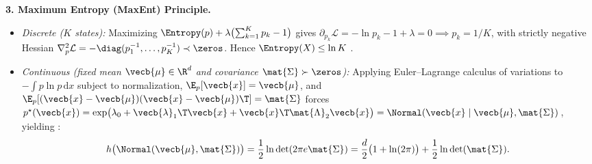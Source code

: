 \documentclass[../../../../master.tex]{subfiles}
\begin{document}
\begin{coremath}
\textbf{3. Maximum Entropy (MaxEnt) Principle.}
\begin{itemize}[leftmargin=1.4em]
  \item \emph{Discrete ($K$ states):} Maximizing $\Entropy(p) + \lambda\bigl(\sum_{k=1}^K p_k - 1\bigr)$ gives $\partial_{p_k}\mathcal{L} = -\ln p_k - 1 + \lambda = 0 \implies p_k = 1/K$, with strictly negative Hessian $\nabla^2_{p}\mathcal{L} = -\diag(p_1^{-1}, \dots, p_K^{-1}) \prec \zeros$. Hence $\Entropy(X) \le \ln K$ .
  \item \emph{Continuous (fixed mean $\vecb{\mu} \in \R^d$ and covariance $\mat{\Sigma} \succ \zeros$):} Applying Euler--Lagrange calculus of variations to $-\int p \ln p\,\mathrm{d}x$ subject to normalization, $\E_p[\vecb{x}] = \vecb{\mu}$, and $\E_p[(\vecb{x}-\vecb{\mu})(\vecb{x}-\vecb{\mu})\T] = \mat{\Sigma}$ forces $p^\star(\vecb{x}) = \exp\bigl(\lambda_0 + \vecb{\lambda}_1\T \vecb{x} + \vecb{x}\T \mat{\Lambda}_2 \vecb{x}\bigr) = \Normal(\vecb{x} \mid \vecb{\mu}, \mat{\Sigma})$, yielding  :
  \begin{equation}
  \label{eq:infotheory:gaussian_entropy}
    h\bigl(\Normal(\vecb{\mu}, \mat{\Sigma})\bigr)
    = \frac{1}{2}\ln\det(2\pi e \mat{\Sigma})
    = \frac{d}{2}\bigl(1 + \ln(2\pi)\bigr) + \frac{1}{2}\ln\det(\mat{\Sigma}).
  \end{equation}
\end{itemize}
\end{coremath}
\end{document}
